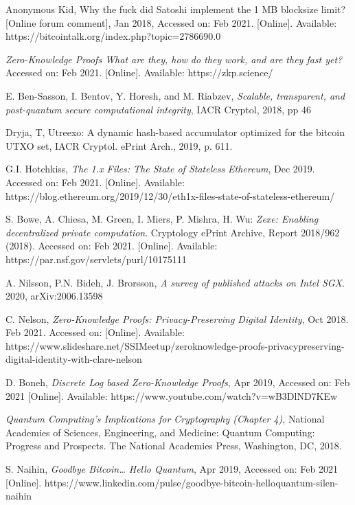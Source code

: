 \documentclass[peerreview]{ieeesyscoin}
\begin{document}
\begin{thebibliography}{00}
 Anonymous Kid, Why the fuck did Satoshi implement the 1 MB blocksize limit? [Online forum comment], Jan 2018, Accessed on: Feb 2021. [Online]. Available:  https://bitcointalk.org/index.php?topic=2786690.0

 \textit{Zero-Knowledge Proofs What are they, how do they work, and are they fast yet?} Accessed on: Feb 2021. [Online]. Available: https://zkp.science/

 E. Ben-Sasson, I. Bentov, Y. Horesh, and M. Riabzev, \textit{Scalable, transparent, and post-quantum secure computational integrity}, IACR Cryptol, 2018, pp 46 

 Dryja, T, Utreexo: A dynamic hash-based accumulator optimized for the bitcoin UTXO set, IACR Cryptol. ePrint Arch., 2019, p. 611.

 G.I. Hotchkiss, \textit{The 1.x Files: The State of Stateless Ethereum}, Dec 2019. Accessed on: Feb 2021. [Online]. Available:   https://blog.ethereum.org/2019/12/30/eth1x-files-state-of-stateless-ethereum/

 S. Bowe, A. Chiesa, M. Green, I. Miers, P. Mishra, H. Wu: \textit{Zexe: Enabling decentralized private computation}. Cryptology ePrint Archive, Report 2018/962 (2018). Accessed on: Feb 2021. [Online]. Available:  https://par.nsf.gov/servlets/purl/10175111

 A. Nilsson, P.N. Bideh, J. Brorsson, \textit{A survey of published attacks on Intel SGX}. 2020, arXiv:2006.13598

 C. Nelson, \textit{Zero-Knowledge Proofs: Privacy-Preserving Digital Identity}, Oct 2018. Feb 2021. Accessed on: [Online]. Available: https://www.slideshare.net/SSIMeetup/zeroknowledge-proofs-privacypreserving-digital-identity-with-clare-nelson

 D. Boneh, \textit{Discrete Log based Zero-Knowledge Proofs}, Apr 2019,  Accessed on: Feb 2021 [Online].  Available: https://www.youtube.com/watch?v=wB3DlND7KEw

 \textit{Quantum Computing’s Implications for Cryptography (Chapter 4)}, National Academies of Sciences, Engineering, and Medicine: Quantum Computing: Progress and Prospects. The National Academies Press, Washington, DC, 2018.

 S. Naihin, \textit{Goodbye Bitcoin… Hello Quantum}, Apr 2019, Accessed on: Feb 2021 [Online].   https://www.linkedin.com/pulse/goodbye-bitcoin-helloquantum-silen-naihin


\end{thebibliography}
\end{document}
